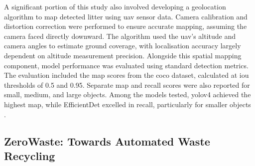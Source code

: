 A significant portion of this study also involved developing a geolocation algorithm to map detected litter using \gls{uav} sensor data. Camera calibration and distortion correction were performed to ensure accurate mapping, assuming the camera faced directly downward. The algorithm used the \gls{uav}'s altitude and camera angles to estimate ground coverage, with localisation accuracy largely dependent on altitude measurement precision.
Alongside this spatial mapping component, model performance was evaluated using standard detection metrics. The evaluation included the \gls{map} scores from the \gls{coco} dataset, calculated at \gls{iou} thresholds of 0.5 and 0.95. Separate \gls{map} and recall scores were also reported for small, medium, and large objects. Among the models tested, \gls{yolo}v4 achieved the highest \gls{map}, while EfficientDet excelled in recall, particularly for smaller objects \cite{uavvaste}.

\subsection{ZeroWaste: Towards Automated Waste Recycling}
\label{subsec:3_zerowaste}


